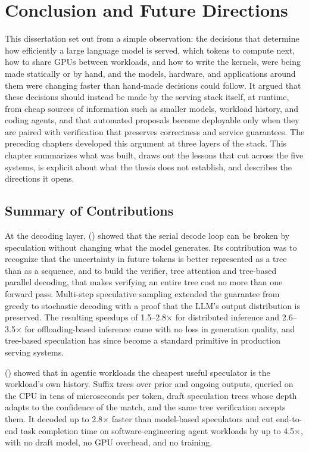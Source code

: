 \chapter{Conclusion and Future Directions}
\label{ch:conclusion}

This dissertation set out from a simple observation: the decisions that determine how efficiently a large language model is served, which tokens to compute next, how to share GPUs between workloads, and how to write the kernels, were being made statically or by hand, and the models, hardware, and applications around them were changing faster than hand-made decisions could follow.
It argued that these decisions should instead be made by the serving stack itself, at runtime, from cheap sources of information such as smaller models, workload history, and coding agents, and that automated proposals become deployable only when they are paired with verification that preserves correctness and service guarantees.
The preceding chapters developed this argument at three layers of the stack.
This chapter summarizes what was built, draws out the lessons that cut across the five systems, is explicit about what the thesis does not establish, and describes the directions it opens.

\section{Summary of Contributions}
\label{conclusion:sec:summary}

At the decoding layer, \SpecInfer () showed that the serial decode loop can be broken by speculation without changing what the model generates.
Its contribution was to recognize that the uncertainty in future tokens is better represented as a tree than as a sequence, and to build the verifier, tree attention and tree-based parallel decoding, that makes verifying an entire tree cost no more than one forward pass.
Multi-step speculative sampling extended the guarantee from greedy to stochastic decoding with a proof that the LLM's output distribution is preserved.
The resulting speedups of 1.5--2.8$\times$ for distributed inference and 2.6--3.5$\times$ for offloading-based inference came with no loss in generation quality, and tree-based speculation has since become a standard primitive in production serving systems.

\SuffixDecoding () showed that in agentic workloads the cheapest useful speculator is the workload's own history.
Suffix trees over prior and ongoing outputs, queried on the CPU in tens of microseconds per token, draft speculation trees whose depth adapts to the confidence of the match, and the same tree verification accepts them.
It decoded up to 2.8$\times$ faster than model-based speculators and cut end-to-end task completion time on software-engineering agent workloads by up to 4.5$\times$, with no draft model, no GPU overhead, and no training.

